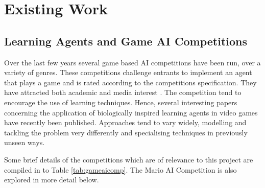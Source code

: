 
\section{Existing Work}


\subsection{Learning Agents and Game AI Competitions}
\label{subsec:gameaicomps}

Over the last few years several game based AI competitions have been run, over a variety of genres. These competitions challenge entrants to implement an agent that plays a game and is rated according to the competitions specification. They have attracted both academic \cite[p.~2]{2012the} and media interest \cite[p.~2]{marioaicomp}. The competition tend to encourage the use of learning techniques. Hence, several interesting papers concerning the application of biologically inspired learning agents in video games have recently been published. Approaches tend to vary widely, modelling and tackling the problem very differently and specialising techniques in previously unseen ways. \cite[p.~11]{2012the}

Some brief details of the competitions which are of relevance to this project are compiled in to Table \ref{tab:gameaicomp}. The Mario AI Competition is also explored in more detail below.


